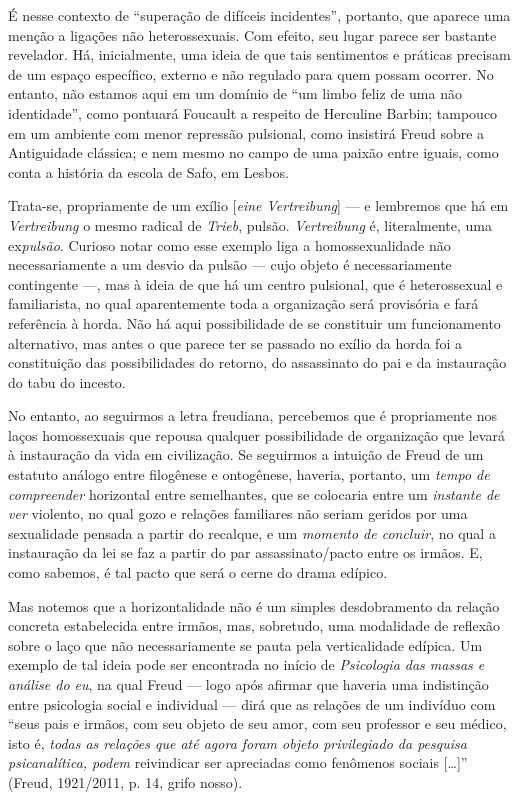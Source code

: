 É nesse contexto de ``superação de difíceis incidentes'', portanto, que
aparece uma menção a ligações não heterossexuais. Com efeito, seu lugar
parece ser bastante revelador. Há, inicialmente, uma ideia de que tais
sentimentos e práticas precisam de um espaço específico, externo e não
regulado para quem possam ocorrer. No entanto, não estamos aqui em um
domínio de ``um limbo feliz de uma não identidade'', como pontuará
Foucault a respeito de Herculine Barbin; tampouco em um ambiente com
menor repressão pulsional, como insistirá Freud sobre a Antiguidade
clássica; e nem mesmo no campo de uma paixão entre iguais, como conta a
história da escola de Safo, em Lesbos.

Trata-se, propriamente de um exílio {[}\emph{eine Vertreibung}{]} --- e
lembremos que há em \emph{Vertreibung} o mesmo radical de \emph{Trieb},
pulsão. \emph{Vertreibung} é, literalmente, uma ex\emph{pulsão}.
Curioso notar como esse exemplo liga a homossexualidade não
necessariamente a um desvio da pulsão --- cujo objeto é necessariamente
contingente ---, mas à ideia de que há um centro pulsional, que é
heterossexual e familiarista, no qual aparentemente toda a organização
será provisória e fará referência à horda. Não há aqui possibilidade de
se constituir um funcionamento alternativo, mas antes o que parece ter
se passado no exílio da horda foi a constituição das possibilidades do
retorno, do assassinato do pai e da instauração do tabu do incesto.

No entanto, ao seguirmos a letra freudiana, percebemos que é
propriamente nos laços homossexuais que repousa qualquer possibilidade
de organização que levará à instauração da vida em civilização. Se
seguirmos a intuição de Freud de um estatuto análogo entre filogênese e
ontogênese, haveria, portanto, um \emph{tempo de compreender} horizontal
entre semelhantes, que se colocaria entre um \emph{instante de ver}
violento, no qual gozo e relações familiares não seriam geridos por uma
sexualidade pensada a partir do recalque, e um \emph{momento de
concluir}, no qual a instauração da lei se faz a partir do par
assassinato/pacto entre os irmãos. E, como sabemos, é tal pacto que será
o cerne do drama edípico.

Mas notemos que a horizontalidade não é um simples desdobramento da
relação concreta estabelecida entre irmãos, mas, sobretudo, uma
modalidade de reflexão sobre o laço que não necessariamente se pauta
pela verticalidade edípica. Um exemplo de tal ideia pode ser encontrada
no início de \emph{Psicologia das massas e análise do eu}, na qual Freud
--- logo após afirmar que haveria uma indistinção entre psicologia
social e individual --- dirá que as relações de um indivíduo com ``seus
pais e irmãos, com seu objeto de seu amor, com seu professor e seu
médico, isto é, \emph{todas as relações que até agora foram objeto
privilegiado da pesquisa psicanalítica, podem} reivindicar ser
apreciadas como fenômenos sociais {[}\ldots{}{]}'' (Freud, 1921/2011, p. 14,
grifo nosso).

